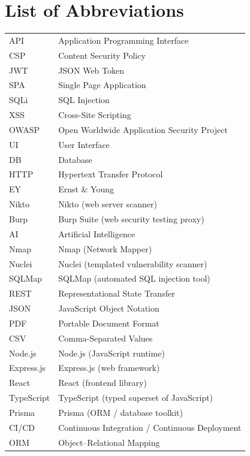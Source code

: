 \chapter*{List of Abbreviations}

\begin{tabular}{ll}
API & Application Programming Interface \\
CSP & Content Security Policy \\
JWT & JSON Web Token \\
SPA & Single Page Application \\
SQLi & SQL Injection \\
XSS & Cross-Site Scripting \\
OWASP & Open Worldwide Application Security Project \\
UI & User Interface \\
DB & Database \\
HTTP & Hypertext Transfer Protocol \\
EY & Ernst \& Young \\
Nikto & Nikto (web server scanner) \\
Burp & Burp Suite (web security testing proxy) \\
AI & Artificial Intelligence \\
Nmap & Nmap (Network Mapper) \\
Nuclei & Nuclei (templated vulnerability scanner) \\
SQLMap & SQLMap (automated SQL injection tool) \\
REST & Representational State Transfer \\
JSON & JavaScript Object Notation \\
PDF & Portable Document Format \\
CSV & Comma-Separated Values \\
Node.js & Node.js (JavaScript runtime) \\
Express.js & Express.js (web framework) \\
React & React (frontend library) \\
TypeScript & TypeScript (typed superset of JavaScript) \\
Prisma & Prisma (ORM / database toolkit) \\
CI/CD & Continuous Integration / Continuous Deployment \\
ORM & Object--Relational Mapping \\
\end{tabular}